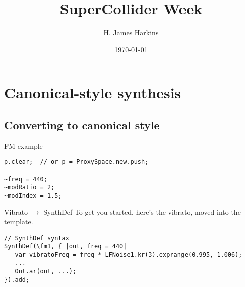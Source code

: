 \documentclass[a4paper,twoside,11pt]{article}
\author{H. James Harkins}
\date{\today}
\title{SuperCollider Week}
\begin{document}
\maketitle

\label{sec-5}
\section{Canonical-style synthesis}
\label{sec-6}
\subsection{Converting to canonical style}
\label{sec-6-1}
\begin{frame}[fragile,label=sec-6-2-2]{FM example}

\begin{lstlisting}
p.clear;  // or p = ProxySpace.new.push;

~freq = 440;
~modRatio = 2;
~modIndex = 1.5;
\end{lstlisting}
\end{frame}
\begin{frame}[fragile,label=sec-6-2-4]{Vibrato $\to$ SynthDef}
 To get you started, here's the vibrato, moved into the template.
\begin{lstlisting}
// SynthDef syntax
SynthDef(\fm1, { |out, freq = 440|
   var vibratoFreq = freq * LFNoise1.kr(3).exprange(0.995, 1.006);
   ...
   Out.ar(out, ...);
}).add;
\end{lstlisting}
\end{frame}
\end{document}
